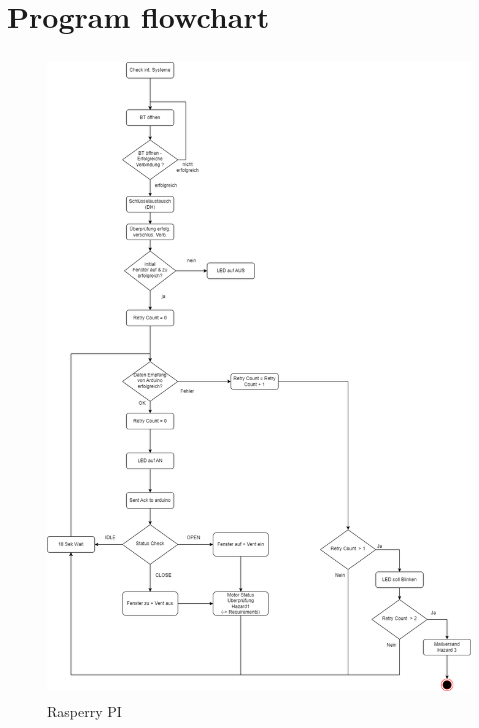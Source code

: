 \section{Program flowchart}
\label{chapter3}


\begin{figure}[h]
	\includegraphics[height=170mm,left]{images/ablaufdiag_pi.drawio.png}
	\centering
	\caption{Rasperry PI}
	\label{fig:system}
\end{figure}

